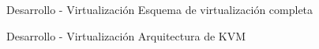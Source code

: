 \begin{frame}{Desarrollo - Virtualización}
    \vspace{0cm} {Esquema de virtualización completa}
    \vspace{0.5cm}
    \begin{figure}[ht]
       \centering
       \vspace{-0.50cm}
    \end{figure}

\end{frame}

\begin{frame}{Desarrollo - Virtualización}
    \vspace{0cm} {Arquitectura de KVM}
    \vspace{0.5cm}
    \begin{figure}[ht]
       \raggedright
       \vspace{-0.50cm} 
    \end{figure}

\end{frame}

